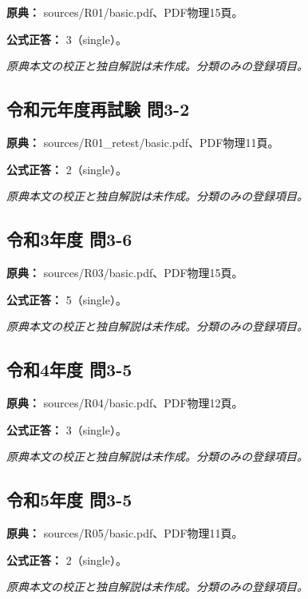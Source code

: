 \noindent\textbf{原典：} sources/R01/basic.pdf、PDF物理15頁。

\textbf{公式正答：} 3（single）。

\par\textit{原典本文の校正と独自解説は未作成。分類のみの登録項目。}

\subsection{令和元年度再試験 問3-2}
\label{q:r01-ret-basic-3-2}

\noindent\textbf{原典：} sources/R01\_retest/basic.pdf、PDF物理11頁。

\textbf{公式正答：} 2（single）。

\par\textit{原典本文の校正と独自解説は未作成。分類のみの登録項目。}

\subsection{令和3年度 問3-6}
\label{q:r03-reg-basic-3-6}

\noindent\textbf{原典：} sources/R03/basic.pdf、PDF物理15頁。

\textbf{公式正答：} 5（single）。

\par\textit{原典本文の校正と独自解説は未作成。分類のみの登録項目。}

\subsection{令和4年度 問3-5}
\label{q:r04-reg-basic-3-5}

\noindent\textbf{原典：} sources/R04/basic.pdf、PDF物理12頁。

\textbf{公式正答：} 3（single）。

\par\textit{原典本文の校正と独自解説は未作成。分類のみの登録項目。}

\subsection{令和5年度 問3-5}
\label{q:r05-reg-basic-3-5}

\noindent\textbf{原典：} sources/R05/basic.pdf、PDF物理11頁。

\textbf{公式正答：} 2（single）。

\par\textit{原典本文の校正と独自解説は未作成。分類のみの登録項目。}

